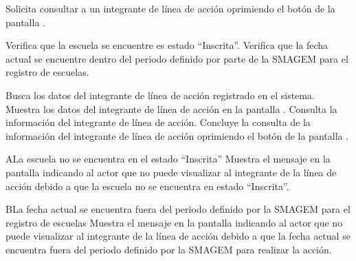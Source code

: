   \begin{UCtrayectoria}
    \UCpaso[\UCactor] Solicita consultar a un integrante de línea de acción oprimiendo el botón \botV de la pantalla .
    
    \UCpaso[\UCsist] Verifica que la escuela se encuentre es estado ``Inscrita''. 
    \UCpaso[\UCsist] Verifica que la fecha actual se encuentre dentro del periodo definido por parte de la SMAGEM para el registro de escuelas. 
    
    \UCpaso[\UCsist] Busca los datos del integrante de línea de acción registrado en el sistema. 
    \UCpaso[\UCsist] Muestra los datos del integrante de línea de acción en la pantalla .
    \UCpaso[\UCactor] Consulta la información del integrante de línea de acción.
    \UCpaso[\UCactor] Concluye la consulta de la información del integrante de línea de acción  oprimiendo el botón  de la pantalla .
 \end{UCtrayectoria}



 \begin{UCtrayectoriaA}{A}{La escuela no se encuentra en el estado ``Inscrita''}
    \UCpaso[\UCsist] Muestra el mensaje  en la pantalla  indicando al actor que no puede visualizar al integrante de la línea de acción debido a que la escuela no se encuentra en estado ``Inscrita''.
 \end{UCtrayectoriaA}

 \begin{UCtrayectoriaA}{B}{La fecha actual se encuentra fuera del periodo definido por la SMAGEM para el registro de escuelas}
    \UCpaso[\UCsist] Muestra el mensaje  en la pantalla  indicando al actor que no puede visualizar al integrante de la línea de acción debido a que la fecha actual se encuentra fuera del periodo definido por la SMAGEM para realizar la acción.
 \end{UCtrayectoriaA}
